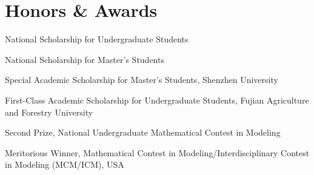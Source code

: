 \section{Honors \& Awards}
\begin{cvitems}
  \item National Scholarship for Undergraduate Students
  \item National Scholarship for Master's Students
  \item Special Academic Scholarship for Master's Students, Shenzhen University
  \item First-Class Academic Scholarship for Undergraduate Students, Fujian Agriculture and Forestry University
  \item Second Prize, National Undergraduate Mathematical Contest in Modeling
  \item Meritorious Winner, Mathematical Contest in Modeling/Interdisciplinary Contest in Modeling (MCM/ICM), USA
\end{cvitems}



